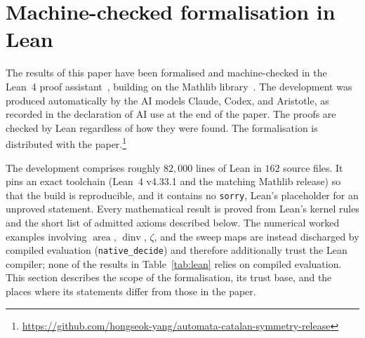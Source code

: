 \documentclass[11pt]{article}
\theoremstyle{definition}
\newcommand{\area}{\operatorname{area}}
\newcommand{\dinv}{\operatorname{dinv}}
\begin{document}
\section{Machine-checked formalisation in Lean}\label{sec:lean}

The results of this paper have been formalised and machine-checked in the
Lean~4 proof assistant~\cite{DeMouraUllrich2021}, building on the Mathlib
library~\cite{MathlibCommunity2020}.  The development was produced
automatically by the AI models Claude, Codex, and Aristotle, as recorded in
the declaration of AI use at the end of the paper.  The proofs are checked by
Lean regardless of how they were found.  The formalisation is distributed with
the paper.\footnote{\url{https://github.com/hongseok-yang/automata-catalan-symmetry-release}}

The development comprises roughly $82{,}000$ lines of Lean in $162$ source
files.  It pins an exact toolchain (Lean~4 v4.33.1 and the matching Mathlib
release) so that the build is reproducible, and it contains no \texttt{sorry},
Lean's placeholder for an unproved statement.  Every mathematical result is
proved from Lean's kernel rules and the short list of admitted axioms described
below.  The numerical worked examples involving $\area$, $\dinv$, $\zeta$, and
the sweep maps are instead discharged by compiled evaluation
(\texttt{native\_decide}) and therefore additionally trust the Lean compiler;
none of the results in Table~\ref{tab:lean} relies on compiled evaluation.  This
section describes the scope of the formalisation, its trust base, and the
places where its statements differ from those in the paper.
\end{document}
